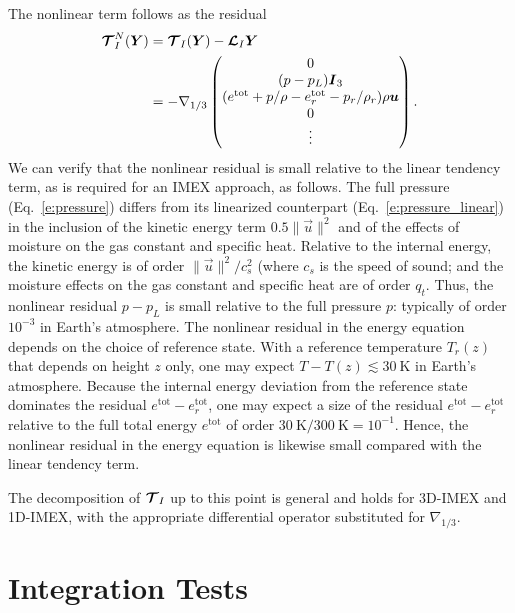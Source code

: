 \documentclass{report}
\begin{document}
The nonlinear term follows as the residual 
\begin{equation}\label{e:nonlinear_residual}
\begin{split}
\boldsymbol{{\mathcal{T}}}^N_{I}(\boldsymbol{{Y}}) & =  \boldsymbol{{\mathcal{T}}}_I(\boldsymbol{{Y}}) - \boldsymbol{{\mathcal{L}}}_I \boldsymbol{{Y}} \\
& = 
-\nabla_{1/3} \begin{pmatrix}
0 \\
(p - p_L) \boldsymbol{{I}}_3\\
(e^{\mathrm{tot}}  + p/\rho - e^{\mathrm{tot}}_r - p_r/\rho_r) \rho \boldsymbol{{u}}\\
0\\
\vdots
\end{pmatrix}.
\end{split}
\end{equation}
We can verify that the nonlinear residual is small relative to the linear tendency term, as is required for an IMEX approach, as follows. The full pressure (Eq.~\ref{e:pressure}) differs from its linearized counterpart (Eq.~\ref{e:pressure_linear}) in the inclusion of the kinetic energy term $0.5 \|\vec{u} \|^2$ and of the effects of moisture on the gas constant and specific heat. Relative to the internal energy, the kinetic energy is of order $\|\vec{u}\|^2/c_s^2$ (where $c_s$ is the speed of sound; 
and the moisture effects on the gas constant and specific heat are of order $q_t$. Thus, the nonlinear residual $p-p_L$ is small relative to the full pressure $p$: typically of order $10^{-3}$ in Earth's atmosphere. The nonlinear residual in the energy equation depends on the choice of reference state. With a reference temperature $T_r(z)$ that depends on height $z$ only, one may expect $T - T(z) \lesssim 30~\mathrm{K}$ in Earth's atmosphere. Because the internal energy deviation from the reference state dominates the residual $e^{\mathrm{tot}} - e^{\mathrm{tot}}_r$, one may expect a size of the residual $e^{\mathrm{tot}} - e^{\mathrm{tot}}_r$ relative to the full total energy $e^{\mathrm{tot}}$ of order $30~\mathrm{K}/300~\mathrm{K} = 10^{-1}$. Hence, the nonlinear residual in the energy equation is likewise small compared with the linear tendency term. 
 
The decomposition of $\boldsymbol{{\mathcal{T}}}_I$ up to this point is general and holds for 3D-IMEX and 1D-IMEX, with the appropriate differential operator substituted for $\nabla_{1/3}$.

\chapter{Integration Tests}\label{s:testing}
\end{document}
